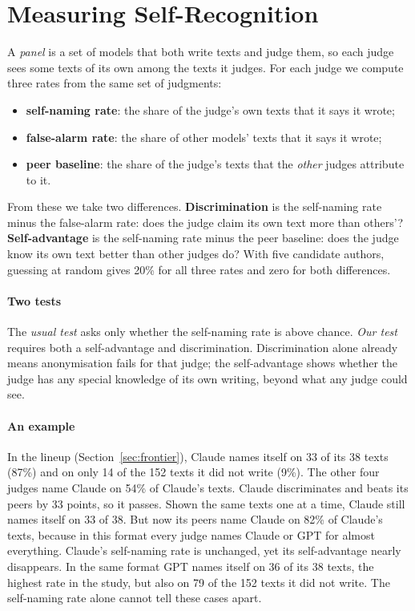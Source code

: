 \section{Measuring Self-Recognition}
\label{sec:measure}

A \emph{panel} is a set of models that both write texts and judge them, so
each judge sees some texts of its own among the texts it judges. For each
judge we compute three rates from the same set of judgments:
\begin{itemize}
\item \textbf{self-naming rate}: the share of the judge's own texts that it
says it wrote;
\item \textbf{false-alarm rate}: the share of other models' texts that it
says it wrote;
\item \textbf{peer baseline}: the share of the judge's texts that the
\emph{other} judges attribute to it.
\end{itemize}
From these we take two differences. \textbf{Discrimination} is the
self-naming rate minus the false-alarm rate: does the judge claim its own
text more than others'? \textbf{Self-advantage} is the self-naming rate minus
the peer baseline: does the judge know its own text better than other judges
do? With five candidate authors, guessing at random gives 20\% for all three
rates and zero for both differences.

\paragraph{Two tests} The \emph{usual test} asks only whether the
self-naming rate is above chance. \emph{Our test} requires both a
self-advantage and discrimination. Discrimination alone already means
anonymisation fails for that judge; the self-advantage shows whether the
judge has any special knowledge of its own writing, beyond what any judge
could see.

\paragraph{An example} In the lineup (Section~\ref{sec:frontier}), Claude
names itself on 33 of its 38 texts (87\%) and on only 14 of the 152 texts it
did not write (9\%). The other four judges name Claude on 54\% of Claude's
texts. Claude discriminates and beats its peers by 33 points, so it passes.
Shown the same texts one at a time, Claude still names itself on 33 of 38.
But now its peers name Claude on 82\% of Claude's texts, because in this
format every judge names Claude or GPT for almost everything. Claude's
self-naming rate is unchanged, yet its self-advantage nearly disappears. In
the same format GPT names itself on 36 of its 38 texts, the highest rate in
the study, but also on 79 of the 152 texts it did not write. The self-naming
rate alone cannot tell these cases apart.

